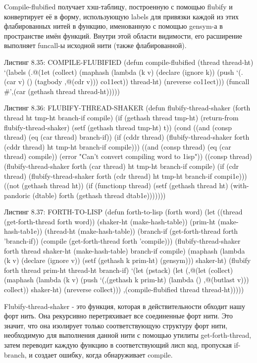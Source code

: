 {{{Compile-flubified получает хэш-таблицу, построенную с помощью flubify и конвертирует её в форму, использующую labels для привязки каждой из этих флабированных нитей в функцию, именованную с помощью gensym-а в пространстве имён функций. Внутри этой области видимости, его расширение выполняет funcall-ы исходной нити (также флабированной).

Листинг 8.35: COMPILE-FLUBIFIED
(defun compile-flubified (thread thread-ht)
‘(labels (.@(1et (collect)
(maphash
(lambda (k v)
(declare (ignore k))
(push
‘(.(car v) ()
(tagbody ,@(cdr v)))
co11ect))
thread-ht)
(nreverse co11ect)))
(funcall #’,(car (gethash thread thread-ht)))))

Листинг 8.36: FLUBIFY-THREAD-SHAKER
(defun flubify-thread-shaker
(forth thread ht tmp-ht branch-if compile)
(if (gethash thread tmp-ht)
(return-from flubify-thread-shaker)
(setf (gethash thread tmp-ht) t))
(cond
((and (consp thread) (eq (car thread) branch-if))
(if (cddr thread)
(flubify-thread-shaker
forth (cddr thread) ht
tmp-ht branch-if compile)))
((and (consp thread) (eq (car thread) compile))
(error "Can't convert compiling word to 1isp"))
((consp thread)
(flubify-thread-shaker
forth (car thread) ht
tmp-ht branch-if compile)
(if (cdr thread)
(flubify-thread-shaker
forth (cdr thread) ht
tmp-ht branch-if compi1e)))
((not (gethash thread ht))
(if (functionp thread)
(setf (gethash thread ht)
(with-pandoric (dtable) forth
(gethash thread dtab1e)))))))

Листинг 8.37: FORTH-TO-LISP
(defun forth-to-lisp (forth word)
(let ((thread (get-forth-thread forth word))
(shaker-ht (make-hash-table))
(prim-ht (make-hash-tab1e))
(thread-ht (make-hash-table))
(branch-if (get-forth-thread forth ’branch-if))
(compile (get-forth-thread forth ’compile)))
(flubify-thread-shaker
forth thread shaker-ht
(make-hash-table) branch-if compile)
(maphash (lambda (k v)
(declare (ignore v))
(setf (gethash k prim-ht) (gensym)))
shaker-ht)
(flubify forth thread prim-ht thread-ht branch-if)
‘(let (pstack)
(let (,@(let (collect)
(maphash
(lambda (k v)
(push ‘(,(gethash k prim-ht)
(lambda () ,@(butlast v)))
collect))
shaker-ht)
(nreverse collect)))
,(compile-flubified
thread thread-ht)))))

Flubify-thread-shaker - это функция, которая в действительности обходит нашу форт нить. Она рекурсивно перетряхивает все соединенные форт нити. Это значит, что она изолирует только соответствующую структуру форт нити, необходимую для выполнения данной нити с помощью утилиты get-forth-thread, затем переводит каждую функцию в соответствующий лисп код, пропуская if-branch, и создает ошибку, когда обнаруживает compile.

}}}
